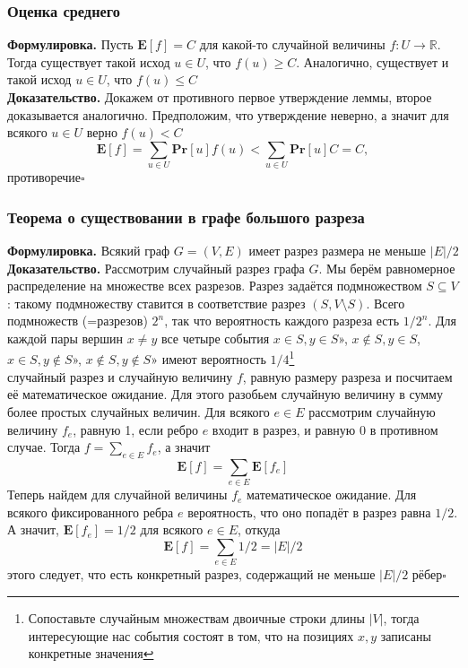 \documentclass[a4paper]{article}
\newcommand{\qed}{\hfill$\square$}
\begin{document}
\subsubsection*{Оценка среднего}
\textbf{Формулировка.} Пусть $\textbf{E}[f]=C$ для какой-то случайной величины $f:U\to\mathbb{R}$. Тогда существует такой исход $u\in U$, что $f(u)\geqslant C$. Аналогично, существует и такой исход $u\in U$, что $f(u)\leqslant C$\\[2mm]
\indent\textbf{Доказательство.} Докажем от противного первое утверждение леммы, второе доказывается аналогично. Предположим, что утверждение неверно, а значит для всякого $u \in U$ верно $f(u)<C$\\
$$
\mathbf{E}[f]=\sum_{u \in U} \textbf{Pr}[u] f(u)<\sum_{u \in U} \textbf{Pr}[u] C=C,
$$
противоречие\qed

\subsubsection*{Теорема о существовании в графе большого разреза}
\textbf{Формулировка.} Всякий граф $G=(V,E)$ имеет разрез размера не меньше $|E|/2$\\[2mm]
\indent\textbf{Доказательство.} Рассмотрим случайный разрез графа $G$. Мы берём равномерное распределение на множестве всех разрезов. Разрез задаётся подмножеством $S \subseteq V$: такому подмножеству ставится в соответствие разрез $(S, V \setminus S)$. Всего подмножеств (=разрезов) $2^{n}$, так что вероятность каждого разреза есть $1 / 2^{n}$. Для каждой пары вершин $x \neq y$ все четыре события \guillemetleft$x \in S, y \in S$», \guillemetleft$x \notin S, y \in S$, \guillemetleft$x \in S, y \notin S$», \guillemetleft$x \notin S, y \notin S$» имеют вероятность $1 / 4$\footnote{Сопоставьте случайным множествам двоичные строки длины $|V|$, тогда интересующие нас события состоят в том, что на позициях $x, y$ записаны конкретные значения}\\[2mm]
 случайный разрез и случайную величину $f$, равную размеру разреза и посчитаем её математическое ожидание. Для этого разобьем случайную величину в сумму более простых случайных величин. Для всякого $e \in E$ рассмотрим случайную величину $f_{e}$, равную 1, если ребро $e$ входит в разрез, и равную 0 в противном случае. Тогда $f=\displaystyle\sum_{e \in E} f_{e}$, а значит
$$
\mathbf{E}[f]=\sum_{e \in E} \mathbf{E}\left[f_{e}\right]
$$
\indent Теперь найдем для случайной величины $f_{e}$ математическое ожидание. Для всякого фиксированного ребра $e$ вероятность, что оно попадёт в разрез равна $1 / 2$. А значит, $\mathbf{E}\left[f_{e}\right]=1 / 2$ для всякого $e \in E$, откуда
$$
\mathbf{E}[f]=\sum_{e \in E} 1 / 2=|E| / 2
$$
 этого следует, что есть конкретный разрез, содержащий не меньше $|E| / 2$ рёбер\qed
\end{document}

